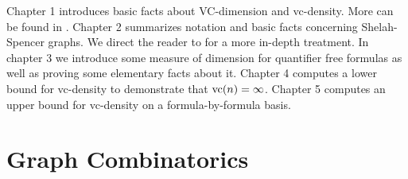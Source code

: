 \documentclass{amsart}
\newcommand{\GG}{\mathcal G}
\newcommand{\A}{\mathcal A}
\newcommand{\B}{\mathcal B}
\begin{document}
Chapter 1 introduces basic facts about VC-dimension and vc-density.
More can be found in \cite{density}.
Chapter 2 summarizes notation and basic facts concerning Shelah-Spencer graphs.
We direct the reader to \cite{laskowski} for a more in-depth treatment.
In chapter 3 we introduce some measure of dimension for quantifier free formulas as well as proving some elementary facts about it.
Chapter 4 computes a lower bound for vc-density to demonstrate that $\operatorname{vc}(n) = \infty$.
Chapter 5 computes an upper bound for vc-density on a formula-by-formula basis.




\section{Graph Combinatorics}
\end{document}

